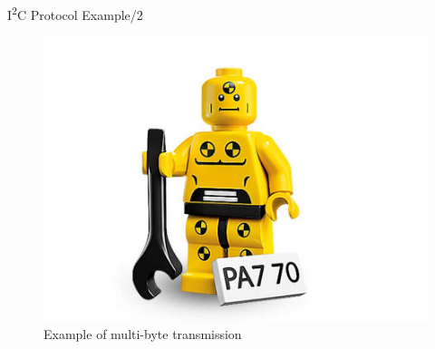 \documentclass[]{beamer} %
\newcommand{\twi}{I\textsuperscript{2}C\xspace}
\newenvironment{changemargin}[2]
{
	\begin{list}{}
		{
			\setlength{\topsep}{0pt}
			\setlength{\leftmargin}{#1}
			\setlength{\rightmargin}{#2}
			\setlength{\listparindent}{\parindent}
		\setlength{\itemindent}{\parindent}
			\setlength{\parsep}{\parskip}
		}
	\item[]
	}
	{
	\end{list}
}
\begin{document}
\begin{frame}[fragile]{\twi Protocol Example/2}
\begin{changemargin}{-0.7cm}{+1cm}
\begin{figure}
				\includegraphics[width=\textwidth,height=0.8\textheight,keepaspectratio]{dummy}
				\caption{Example of multi-byte transmission}
			\end{figure}
	\end{changemargin}
\end{frame}
\end{document}
